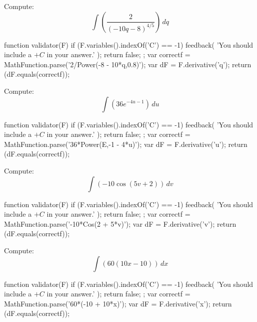 \documentclass{ximera}
\renewcommand{\d}{\, d}
\begin{document}
\begin{exercise}
Compute: 
\[
\int \left(\frac{2}{(-10 q-8)^{4/5}}\right)\d q
\]
\begin{expressionAnswer}
     function validator(F) {
      if (F.variables().indexOf('C') == -1) {
        feedback( 'You should include a $+C$ in your answer.' );
        return false;
      };      
      var correctf = MathFunction.parse('2/Power(-8 - 10*q,0.8)');
      var dF = F.derivative('q');
      return (dF.equals(correctf));
    }
\end{expressionAnswer}
\end{exercise}



\begin{exercise}
Compute: 
\[
\int \left(36 e^{-4 u-1}\right)\d u
\]
\begin{expressionAnswer}
     function validator(F) {
      if (F.variables().indexOf('C') == -1) {
        feedback( 'You should include a $+C$ in your answer.' );
        return false;
      };      
      var correctf = MathFunction.parse('36*Power(E,-1 - 4*u)');
      var dF = F.derivative('u');
      return (dF.equals(correctf));
    }
\end{expressionAnswer}
\end{exercise}



\begin{exercise}
Compute: 
\[
\int \left(-10 \cos (5 v+2)\right)\d v
\]
\begin{expressionAnswer}
     function validator(F) {
      if (F.variables().indexOf('C') == -1) {
        feedback( 'You should include a $+C$ in your answer.' );
        return false;
      };      
      var correctf = MathFunction.parse('-10*Cos(2 + 5*v)');
      var dF = F.derivative('v');
      return (dF.equals(correctf));
    }
\end{expressionAnswer}
\end{exercise}



\begin{exercise}
Compute: 
\[
\int \left(60 (10 x-10)\right)\d x
\]
\begin{expressionAnswer}
     function validator(F) {
      if (F.variables().indexOf('C') == -1) {
        feedback( 'You should include a $+C$ in your answer.' );
        return false;
      };      
      var correctf = MathFunction.parse('60*(-10 + 10*x)');
      var dF = F.derivative('x');
      return (dF.equals(correctf));
    }
\end{expressionAnswer}
\end{exercise}
\end{document}
